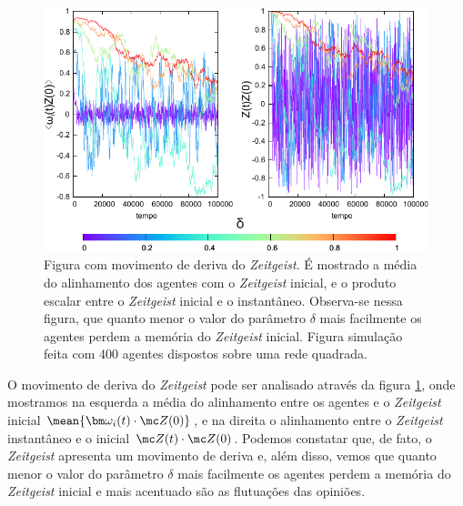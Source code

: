 \begin{figure}
\centering
\includegraphics[width=1.2\textwidth]{Figures/evolveAngulosSemFixos}
\caption{Figura com movimento de deriva do \textit{Zeitgeist}. É mostrado a
média do alinhamento dos agentes com o \textit{Zeitgeist} inicial, e o produto
escalar entre o \textit{Zeitgeist} inicial e o instantâneo. Observa-se nessa
figura, que quanto menor o valor do parâmetro $\delta$ mais facilmente
os agentes perdem a memória do \textit{Zeitgeist} inicial. Figura
simulação feita com 400 agentes dispostos sobre uma rede quadrada.}
\label{fig:evolveAngulosSemFixos}
\end{figure}

O movimento de deriva do \textit{Zeitgeist} pode ser analisado através
da figura \ref{fig:evolveAngulosSemFixos}, onde mostramos na esquerda
a média do alinhamento entre os agentes e o \textit{Zeitgeist} inicial
$\mean{\bm \omega_i(t)\cdot\mc Z(0)}$, e na direita o alinhamento entre
o \textit{Zeitgeist} instantâneo e o inicial $\mc Z(t)\cdot \mc Z(0)
$. Podemos constatar que, de fato, o \textit{Zeitgeist} apresenta um movimento
de deriva e, além disso, vemos que quanto menor o valor do parâmetro
$\delta$ mais facilmente os agentes perdem a memória do \textit{Zeitgeist}
inicial e mais acentuado são as flutuações das opiniões.

